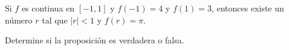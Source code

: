 \item Si $f$ es continua en $[-1, 1]$ y $f(-1) = 4$ y $f(1) = 3$, entonces existe un número $r$ tal que $|r| < 1$ y $f(r) = \pi$.
\par
Determine si la proposición es verdadera o falsa.
